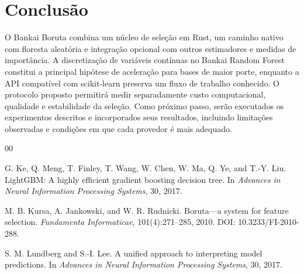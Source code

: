 \documentclass[a4,11pt]{wmecai}
\begin{document}
\section{Conclusão}
O Bankai Boruta combina um núcleo de seleção em Rust, um caminho nativo com floresta aleatória e integração opcional com outros estimadores e medidas de importância. A discretização de variáveis contínuas no Bankai Random Forest constitui a principal hipótese de aceleração para bases de maior porte, enquanto a API compatível com scikit-learn preserva um fluxo de trabalho conhecido. O protocolo proposto permitirá medir separadamente custo computacional, qualidade e estabilidade da seleção. Como próximo passo, serão executados os experimentos descritos e incorporados seus resultados, incluindo limitações observadas e condições em que cada provedor é mais adequado.

\begin{thebibliography}{00}

G. Ke, Q. Meng, T. Finley, T. Wang, W. Chen, W. Ma, Q. Ye, and T.-Y. Liu. LightGBM: A highly efficient gradient boosting decision tree. In \textit{Advances in Neural Information Processing Systems}, 30, 2017.

M. B. Kursa, A. Jankowski, and W. R. Rudnicki. Boruta---a system for feature selection. \textit{Fundamenta Informaticae}, 101(4):271--285, 2010. DOI: 10.3233/FI-2010-288.

S. M. Lundberg and S.-I. Lee. A unified approach to interpreting model predictions. In \textit{Advances in Neural Information Processing Systems}, 30, 2017.

\end{thebibliography}
\end{document}
